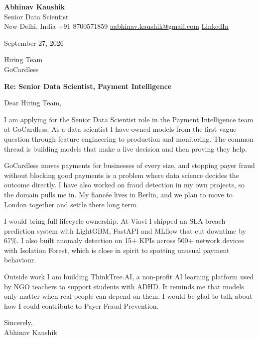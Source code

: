 \documentclass[11pt,a4paper]{article}
\begin{document}
{\Large\bfseries Abhinav Kaushik}\\
Senior Data Scientist\\
New Delhi, India \textbar{} +91 8700571859 \textbar{} \href{mailto:aabhinav.kaushik@gmail.com}{aabhinav.kaushik@gmail.com} \textbar{} \href{https://www.linkedin.com/in/abhinav-kaushik10/}{LinkedIn}  

September 27, 2026

Hiring Team\\
GoCardless

\textbf{Re: Senior Data Scientist, Payment Intelligence}

Dear Hiring Team,

I am applying for the Senior Data Scientist role in the Payment Intelligence team at GoCardless. As a data scientist I have owned models from the first vague question through feature engineering to production and monitoring. The common thread is building models that make a live decision and then proving they help.

GoCardless moves payments for businesses of every size, and stopping payer fraud without blocking good payments is a problem where data science decides the outcome directly. I have also worked on fraud detection in my own projects, so the domain pulls me in. My fiancée lives in Berlin, and we plan to move to London together and settle there long term.

I would bring full lifecycle ownership. At Viavi I shipped an SLA breach prediction system with LightGBM, FastAPI and MLflow that cut downtime by 67\%. I also built anomaly detection on 15+ KPIs across 500+ network devices with Isolation Forest, which is close in spirit to spotting unusual payment behaviour.

Outside work I am building ThinkTree.AI, a non-profit AI learning platform used by NGO teachers to support students with ADHD. It reminds me that models only matter when real people can depend on them. I would be glad to talk about how I could contribute to Payer Fraud Prevention.

Sincerely,\\[4pt]
Abhinav Kaushik
\end{document}
